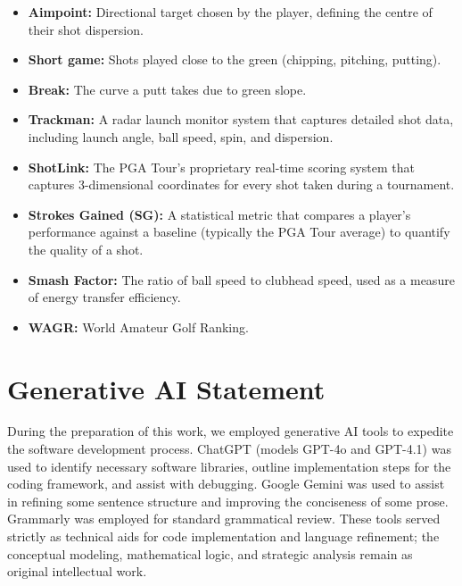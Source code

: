 \documentclass[11pt, letterpaper]{article}
\begin{document}
\begin{itemize}[noitemsep]
    \item \textbf{Aimpoint:} Directional target chosen by the player, defining the centre of their shot dispersion.
    \item \textbf{Short game:} Shots played close to the green (chipping, pitching, putting).
    \item \textbf{Break:} The curve a putt takes due to green slope.
    \item \textbf{Trackman:} A radar launch monitor system that captures detailed shot data, including launch angle, ball speed, spin, and dispersion.
    \item \textbf{ShotLink:} The PGA Tour's proprietary real-time scoring system that captures 3-dimensional coordinates for every shot taken during a tournament.
    \item \textbf{Strokes Gained (SG):} A statistical metric that compares a player's performance against a baseline (typically the PGA Tour average) to quantify the quality of a shot.
    \item \textbf{Smash Factor:} The ratio of ball speed to clubhead speed, used as a measure of energy transfer efficiency.
    \item \textbf{WAGR:} World Amateur Golf Ranking.
\end{itemize}











\newpage 



\printbibliography[title={References}]

\vspace{2cm}


\section*{Generative AI Statement}
\noindent
During the preparation of this work, we employed generative AI tools to expedite the software development process. ChatGPT (models GPT-4o and GPT-4.1) was used to identify necessary software libraries, outline implementation steps for the coding framework, and assist with debugging. Google Gemini was used to assist in refining some sentence structure and improving the conciseness of some prose. Grammarly was employed for standard grammatical review. These tools served strictly as technical aids for code implementation and language refinement; the conceptual modeling, mathematical logic, and strategic analysis remain as  original intellectual work.
\end{document}
